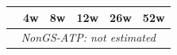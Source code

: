 \begin{tabular}{l*{5}{c}}
\toprule
 & 4w & 8w & 12w & 26w & 52w \\
\midrule
\multicolumn{6}{c}{\textit{NonGS-ATP: not estimated}} \\
\bottomrule
\end{tabular}
